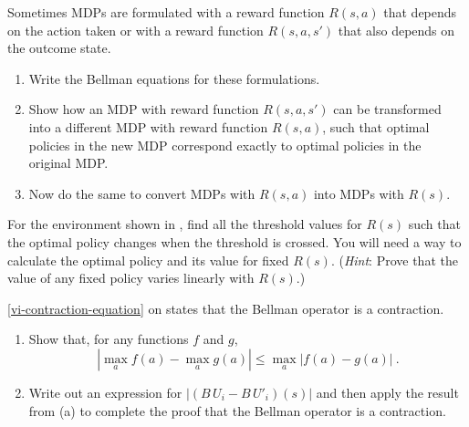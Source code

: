 \begin{exercise}
Sometimes MDPs are formulated with a reward function \(R(s,a)\) that
depends on the action taken or with a reward function
\(R(s,a,s')\) that also depends on the outcome state.
\begin{enumerate}
\item Write the Bellman equations for these formulations.
\item Show how an MDP with reward function \(R(s,a,s')\)
can be transformed into a different MDP with reward function \(R(s,a)\),
such that optimal policies in the new MDP correspond exactly to
optimal policies in the original MDP.
\item Now do the same to convert MDPs with \(R(s,a)\)
into MDPs with \(R(s)\).
\end{enumerate}
\end{exercise} 

\begin{exercise}%
\prgex
For the environment shown in
, find all the threshold
values for \(R(s)\) such that the optimal policy changes
when the threshold is crossed. You will need a way to calculate the
optimal policy and its value for fixed \(R(s)\). ({\em Hint}: Prove that
the value of any fixed policy varies linearly with \(R(s)\).)
\end{exercise} 



\begin{exercise}
\eqref{vi-contraction-equation} on  states
that the Bellman operator is a contraction. 
\begin{enumerate}
\item Show that, for any functions \(f\) and \(g\),
\[ |\max_a f(a) - \max_a g(a)| \leq \max_a |f(a) - g(a)|\ .\]
\item Write out an expression for \(|(B\,U_i - B\,U'_i)(s)|\)
and then apply the result from (a) to complete the proof
that the Bellman operator is a contraction.
\end{enumerate}
\end{exercise} 

